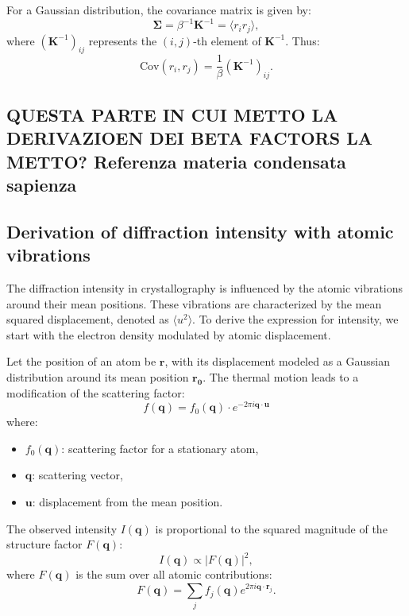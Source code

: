 \documentclass[English, Lau, oneside]{sapthesis}
\begin{document}
For a Gaussian distribution, the covariance matrix is given by:
\begin{equation}
    \bm{\Sigma} = \beta^{-1} \mathbf{K}^{-1} = \langle r_i r_j \rangle,
\end{equation}
where \((\mathbf{K}^{-1})_{ij}\) represents the \((i,j)\)-th element of \(\mathbf{K}^{-1}\). Thus:
\begin{equation}
    \text{Cov}(r_i, r_j) = \frac{1}{\beta} (\mathbf{K}^{-1})_{ij}.
\end{equation}



\subsection*{QUESTA PARTE IN CUI METTO LA DERIVAZIOEN DEI BETA FACTORS LA METTO? Referenza materia condensata sapienza}
\subsection*{Derivation of diffraction intensity with atomic vibrations}
\noindent The diffraction intensity in crystallography is influenced by the atomic vibrations around their mean positions. These vibrations are characterized by the mean squared displacement, denoted as $\langle u^2 \rangle$. To derive the expression for intensity, we start with the electron density modulated by atomic displacement.

Let the position of an atom be $\mathbf{r}$, with its displacement modeled as a Gaussian distribution around its mean position $\mathbf{r_0}$. The thermal motion leads to a modification of the scattering factor:
\[
f(\mathbf{q}) = f_0(\mathbf{q}) \cdot e^{-2\pi i \mathbf{q} \cdot \mathbf{u}}
\]
where:
\begin{itemize}
    \item $f_0(\mathbf{q})$: scattering factor for a stationary atom,
    \item $\mathbf{q}$: scattering vector,
    \item $\mathbf{u}$: displacement from the mean position.
\end{itemize}

The observed intensity $I(\mathbf{q})$ is proportional to the squared magnitude of the structure factor $F(\mathbf{q})$:
\[
I(\mathbf{q}) \propto |F(\mathbf{q})|^2,
\]
where $F(\mathbf{q})$ is the sum over all atomic contributions:
\[
F(\mathbf{q}) = \sum_j f_j(\mathbf{q}) e^{2\pi i \mathbf{q} \cdot \mathbf{r}_j}.
\]
\end{document}
